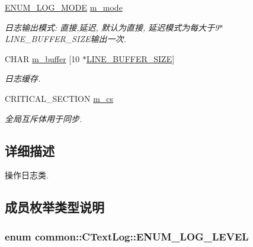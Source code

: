 \begin{DoxyCompactItemize}
\hyperlink{classcommon_1_1_c_text_log_ab0c8fabb54ada6443cadd1fbfe65cf2e}{E\+N\+U\+M\+\_\+\+L\+O\+G\+\_\+\+M\+O\+D\+E} \hyperlink{classcommon_1_1_c_text_log_a3c4007ae4cddee7343b9fd158ca6d07d}{m\+\_\+mode}
\begin{DoxyCompactList}\small\item\em 日志输出模式\+: 直接,延迟, 默认为直接, 延迟模式为每大于9$\ast$\+L\+I\+N\+E\+\_\+\+B\+U\+F\+F\+E\+R\+\_\+\+S\+I\+Z\+E输出一次. \end{DoxyCompactList}\item 
C\+H\+A\+R \hyperlink{classcommon_1_1_c_text_log_a404b1bc0f4585481dfccb0b73fe4d388}{m\+\_\+buffer} \mbox{[}10 $\ast$\hyperlink{_text_log_8h_afa0499dcb85922b683da3918f512adb6}{L\+I\+N\+E\+\_\+\+B\+U\+F\+F\+E\+R\+\_\+\+S\+I\+Z\+E}\mbox{]}
\begin{DoxyCompactList}\small\item\em 日志缓存. \end{DoxyCompactList}\item 
C\+R\+I\+T\+I\+C\+A\+L\+\_\+\+S\+E\+C\+T\+I\+O\+N \hyperlink{classcommon_1_1_c_text_log_a674dc6bfc676698846a7f8fee11f2e83}{m\+\_\+cs}
\begin{DoxyCompactList}\small\item\em 全局互斥体用于同步. \end{DoxyCompactList}\end{DoxyCompactItemize}


\subsection{详细描述}
操作日志类. 

\subsection{成员枚举类型说明}
\hypertarget{classcommon_1_1_c_text_log_ae22e9f5eba143051e1193e62caf63aee}{
\subsubsection[{E\+N\+U\+M\+\_\+\+L\+O\+G\+\_\+\+L\+E\+V\+E\+L}]{\setlength{\rightskip}{0pt plus 5cm}enum {\bf common\+::\+C\+Text\+Log\+::\+E\+N\+U\+M\+\_\+\+L\+O\+G\+\_\+\+L\+E\+V\+E\+L}}}\label{classcommon_1_1_c_text_log_ae22e9f5eba143051e1193e62caf63aee}


